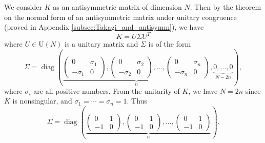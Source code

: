 \documentclass[11pt, a4paper]{article}
\numberwithin{equation}{section}
\newcommand{\Unitary}{\mathrm{U}}
\DeclareMathOperator{\diag}{diag}
\theoremstyle{definition}
\theoremstyle{remark}
\begin{document}
We consider $K$ as an antisymmetric matrix of dimension $N$. Then by the theorem on the normal form of an antisymmetric matrix under unitary congruence (proved in Appendix \ref{subsec:Takagi_and_antisymm}), we have
\begin{equation} \label{eq:decomposition_of_antisymm_K}
  K = U \Sigma U^T
\end{equation}
where $U \in \Unitary(N)$  is a unitary matrix and $\Sigma$ is of the form
\begin{equation}
  \Sigma = \diag \left(
    \underbrace{
      \begin{pmatrix}
        0 & \sigma_1 \\
        -\sigma_1 & 0
      \end{pmatrix},
      \begin{pmatrix}
        0 & \sigma_2 \\
        -\sigma_2 & 0
      \end{pmatrix},
      \dotsc,
      \begin{pmatrix}
        0 & \sigma_n \\
        -\sigma_n & 0
      \end{pmatrix}
    }_n ,
    \underbrace{0, \dotsc, 0}_{N - 2n} \right),
\end{equation}
where $\sigma_i$ are all positive numbers. From the unitarity of $K$, we have $N = 2n$ since $K$ is nonsingular, and $\sigma_1 = \dotsb = \sigma_n = 1$. Thus
\begin{equation}
  \Sigma = \diag \left(
    \underbrace{
      \begin{pmatrix}
        0 & 1 \\
        -1 & 0
      \end{pmatrix},
      \begin{pmatrix}
        0 & 1 \\
        -1 & 0
      \end{pmatrix},
      \dotsc,
      \begin{pmatrix}
        0 & 1 \\
        -1 & 0 
      \end{pmatrix}
    }_n
  \right).
\end{equation}
\end{document}

